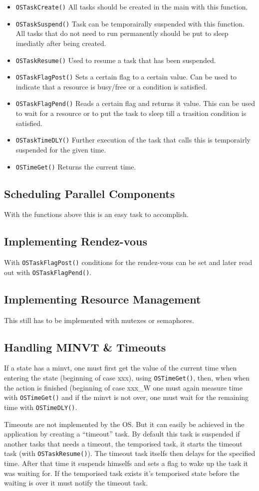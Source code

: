 \documentclass[../main.tex]{subfiles}
\begin{document}
\begin{itemize}
	\item \lstinline{OSTaskCreate()} All tasks should be created in the main with this function.
	\item \lstinline{OSTaskSuspend()} Task can be temporairally suspended with this function. All tasks that do not need to run permanently should be put to sleep imediatly after being created.
	\item \lstinline{OSTaskResume()} Used to resume a task that has been suspended.
	\item \lstinline{OSTaskFlagPost()} Sets a certain flag to a certain value. Can be used to indicate that a resource is busy/free or a condition is satisfied.  
	\item \lstinline{OSTaskFlagPend()} Reads a certain flag and returns it value. This can be used to wait for a resource or to put the task to sleep till a trasition condition is satisfied.
	\item \lstinline{OSTaskTimeDLY()} Further execution of the task that calls this is temporairly suspended for the given time.
	\item \lstinline{OSTimeGet()} Returns the current time.
\end{itemize}

\subsection{Scheduling Parallel Components}
With the functions above this is an easy task to accomplish.
\subsection{Implementing Rendez-vous}
With \lstinline{OSTaskFlagPost()} conditions for the rendez-vous can be set and later read out with \lstinline{OSTaskFlagPend()}.
\subsection{Implementing Resource Management}
This still has to be implemented with mutexes or semaphores.

\subsection{Handling MINVT \& Timeouts}
If a state has a minvt, one must first get the value of the current time when entering the state (beginning of case xxx), using \lstinline{OSTimeGet()}, then, when when the action is finished (beginning of case xxx\_W one must again measure time with \lstinline{OSTimeGet()} and if the minvt is not over, one must wait for the remaining time with \lstinline{OSTimeDLY()}. 

Timeouts are not implemented by the OS. 
But it can easily be achieved in the application by creating a ``timeout'' task.
By default this task is suspended if another tasks that needs a timeout, the temporised task, it starts the timeout task (with \lstinline{OSTaskResume()}).
The timeout task itselfs then delays for the specified time. After that time it suspends himselfs and sets a flag to wake up the task it was waiting for. 
If the temporised task exists it's temporised state before the waiting is over it must notify the timeout task.
\end{document}
